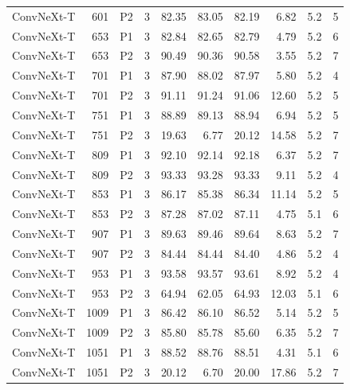 {\begin{longtable}{lrllrrrrrr}
ConvNeXt-T & 601 & P2 & 3 & 82.35 & 83.05 & 82.19 & 6.82 & 5.2 & 5 \\
ConvNeXt-T & 653 & P1 & 3 & 82.84 & 82.65 & 82.79 & 4.79 & 5.2 & 6 \\
ConvNeXt-T & 653 & P2 & 3 & 90.49 & 90.36 & 90.58 & 3.55 & 5.2 & 7 \\
ConvNeXt-T & 701 & P1 & 3 & 87.90 & 88.02 & 87.97 & 5.80 & 5.2 & 4 \\
ConvNeXt-T & 701 & P2 & 3 & 91.11 & 91.24 & 91.06 & 12.60 & 5.2 & 5 \\
ConvNeXt-T & 751 & P1 & 3 & 88.89 & 89.13 & 88.94 & 6.94 & 5.2 & 5 \\
ConvNeXt-T & 751 & P2 & 3 & 19.63 & 6.77 & 20.12 & 14.58 & 5.2 & 7 \\
ConvNeXt-T & 809 & P1 & 3 & 92.10 & 92.14 & 92.18 & 6.37 & 5.2 & 7 \\
ConvNeXt-T & 809 & P2 & 3 & 93.33 & 93.28 & 93.33 & 9.11 & 5.2 & 4 \\
ConvNeXt-T & 853 & P1 & 3 & 86.17 & 85.38 & 86.34 & 11.14 & 5.2 & 5 \\
ConvNeXt-T & 853 & P2 & 3 & 87.28 & 87.02 & 87.11 & 4.75 & 5.1 & 6 \\
ConvNeXt-T & 907 & P1 & 3 & 89.63 & 89.46 & 89.64 & 8.63 & 5.2 & 7 \\
ConvNeXt-T & 907 & P2 & 3 & 84.44 & 84.44 & 84.40 & 4.86 & 5.2 & 4 \\
ConvNeXt-T & 953 & P1 & 3 & 93.58 & 93.57 & 93.61 & 8.92 & 5.2 & 4 \\
ConvNeXt-T & 953 & P2 & 3 & 64.94 & 62.05 & 64.93 & 12.03 & 5.1 & 6 \\
ConvNeXt-T & 1009 & P1 & 3 & 86.42 & 86.10 & 86.52 & 5.14 & 5.2 & 5 \\
ConvNeXt-T & 1009 & P2 & 3 & 85.80 & 85.78 & 85.60 & 6.35 & 5.2 & 7 \\
ConvNeXt-T & 1051 & P1 & 3 & 88.52 & 88.76 & 88.51 & 4.31 & 5.1 & 6 \\
ConvNeXt-T & 1051 & P2 & 3 & 20.12 & 6.70 & 20.00 & 17.86 & 5.2 & 7 \\
\end{longtable}
}
